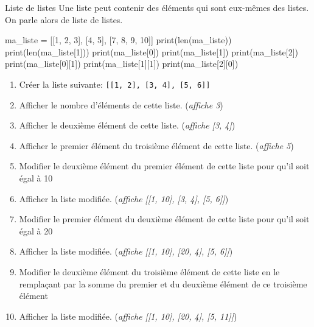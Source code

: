 \begin{easybox}{Liste de listes}{}
	Une liste peut contenir des éléments qui sont eux-mêmes des listes. On parle alors de liste de listes.

\begin{ConsolePythontex}[TaillePolice=\normalsize, Label=false]{}
ma_liste = [[1, 2, 3], [4, 5], [7, 8, 9, 10]]
print(len(ma_liste))
print(len(ma_liste[1]))
print(ma_liste[0])
print(ma_liste[1])
print(ma_liste[2])
print(ma_liste[0][1])
print(ma_liste[1][1])
print(ma_liste[2][0])
		\end{ConsolePythontex}

		

\end{easybox}

\begin{exercice_cours}{}
	\begin{enumerate}
		\item Créer la liste suivante: \verb|[[1, 2], [3, 4], [5, 6]]|
		\item Afficher le nombre d'éléments de cette liste. (\emph{affiche 3})
		\item Afficher le deuxième élément de cette liste. (\emph{affiche [3, 4]})
		\item Afficher le premier élément du troisième élément de cette liste. (\emph{affiche 5})
		\item Modifier le deuxième élément du premier élément de cette liste pour qu'il soit égal à 10
		\item Afficher la liste modifiée. (\emph{affiche [[1, 10], [3, 4], [5, 6]]})
		\item Modifier le premier élément du deuxième élément de cette liste pour qu'il soit égal à 20
		\item Afficher la liste modifiée. (\emph{affiche [[1, 10], [20, 4], [5, 6]]})	
		\item Modifier le deuxième élément du troisième élément de cette liste en le remplaçant par la somme du premier et du deuxième élément de ce troisième élément
		\item Afficher la liste modifiée. (\emph{affiche [[1, 10], [20, 4], [5, 11]]})
	\end{enumerate}
\end{exercice_cours}

\pagebreak


